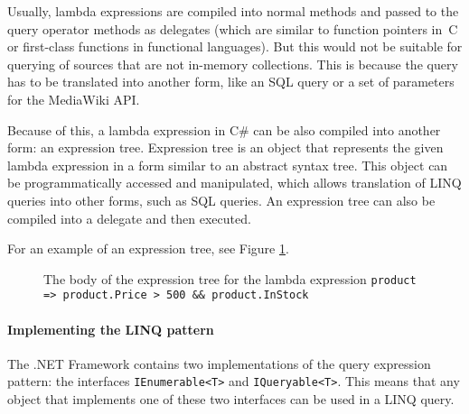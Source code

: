 Usually, lambda expressions are compiled into normal methods and passed to the query operator methods as delegates
(which are similar to function pointers in~C or first-class functions in functional languages).
But this would not be suitable for querying of sources that are not in-memory collections.
This is because the query has to be translated into another form,
like an \ac{SQL} query or a set of parameters for the MediaWiki \ac{API}.

Because of this, a lambda expression in C\# can be also compiled into another form:
an expression tree.
Expression tree is an object that represents the given lambda expression
in a form similar to an abstract syntax tree.
This object can be programmatically accessed and manipulated,
which allows translation of \ac{LINQ} queries into other forms, such as \ac{SQL} queries.
An expression tree can also be compiled into a delegate and then executed.

For an example of an expression tree, see Figure \ref{Expression tree}.

\begin{figure}[htbp]
\begin{center}
\end{center}

\caption[Example body of expression tree]
{The body of the expression tree for the lambda expression \lstinline,product => product.Price > 500 && product.InStock,}
\label{Expression tree}
\end{figure}

\paragraph{Implementing the LINQ pattern}

The .NET Framework contains two implementations of the query expression pattern:
the interfaces \lstinline,IEnumerable<T>, and \lstinline,IQueryable<T>,.
This means that any object that implements one of these two interfaces can be used in a \ac{LINQ} query.

